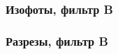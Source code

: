 \documentclass[aspectratio=169, hyperref={bookmarks=false}]{beamer}
\begin{document}
\begin{frame}
\frametitle{Изофоты, фильтр B}

    \begin{minipage}[h]{0.9\linewidth} 
    \end{minipage}

\end{frame}

\begin{frame}
\frametitle{Разрезы, фильтр B}

    \begin{minipage}[h]{0.9\linewidth}
    \end{minipage}

\end{frame}
\end{document}
